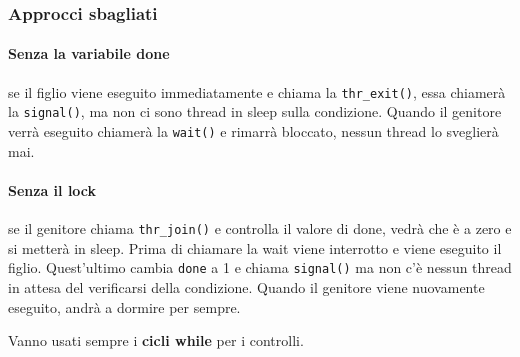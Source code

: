 \documentclass[12pt, letterpaper]{article}
\begin{document}
			\subsubsection{Approcci sbagliati}
				\paragraph{Senza la variabile done} se il figlio viene eseguito immediatamente e chiama la \texttt{thr\_exit()}, essa chiamerà la \texttt{signal()}, ma non ci sono thread in sleep sulla condizione. Quando il genitore verrà eseguito chiamerà la \texttt{wait()} e rimarrà bloccato, nessun thread lo sveglierà mai. 
			
				\paragraph{Senza il lock} se il genitore chiama \texttt{thr\_join()} e controlla il valore di done, vedrà che è a zero e si metterà in sleep. Prima di chiamare la wait viene interrotto e viene eseguito il figlio. Quest'ultimo cambia \texttt{done} a 1 e chiama \texttt{signal()} ma non c'è nessun thread in attesa del verificarsi della condizione. Quando il genitore viene nuovamente eseguito, andrà a dormire per sempre.
			
				Vanno usati sempre i \textbf{cicli while} per i controlli.
			
\end{document}
